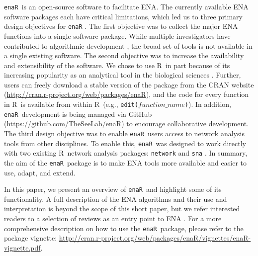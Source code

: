 \documentclass[11pt]{article}
\newcommand{\R}{R}
\newcommand{\enaR}{\texttt{enaR}}
\begin{document}
\begin{spacing}{2}
\enaR\ is an open-source software to facilitate ENA.  The currently
available ENA software packages \citep{ulanowicz91, kazanci07,
  allesina04_wand, christensen04, fath06} each have critical
limitations, which led us to three primary design objectives for \enaR
.  The first objective was to collect the major ENA functions into a
single software package.  While multiple investigators have
contributed to algorithmic development \citep[e.g.,][]{finn76,
  ulanowicz86, ulanowicz91, fath99_review, allesina03}, the broad set
of tools is not available in a single existing software.  The second
objective was to increase the availability and extensibility of the
software. We chose to use \R\ in part because of its increasing
popularity as an analytical tool in the biological sciences
\citep[e.g.,][]{dixon2003vegan, metcalf2012, revell2012phytools}.
Further, users can freely download a stable version of the package
from the CRAN website
(\url{http://cran.r-project.org/web/packages/enaR}), and the code for
every function in \R\ is available from within \R\ (e.g.,
\texttt{edit($function\_name$)}).  In addition, \enaR\ development is
being managed via GitHub (\url{https://github.com/TheSeeLab/enaR}) to
encourage collaborative development.  The third design objective was
to enable \enaR\ users access to network analysis tools from other
disciplines.  To enable this, \enaR\ was designed to work directly
with two existing \R\ network analysis packages:  \texttt{network}
\citep{butts08_network} and \texttt{sna} \citep{butts08_social}.  In
summary, the aim of the \enaR\ package is to make ENA tools more
available and easier to use, adapt, and extend.

In this paper, we present an overview of \enaR\ and highlight some of
its functionality.  A full description of the ENA algorithms and their
use and interpretation is beyond the scope of this short paper, but we
refer interested readers to a selection of reviews as an entry point
to ENA \citep{fath99_review, ulanowicz97, fath06, schramski11,
  jorgensen07_newecology}.  For a more comprehensive description on
how to use the \enaR\ package, please refer to the package vignette:
\url{http://cran.r-project.org/web/packages/enaR/vignettes/enaR-vignette.pdf}.


\end{spacing}
\end{document}

